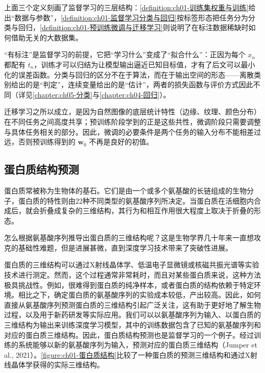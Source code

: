 \documentclass[../../main.tex]{subfiles}
\begin{document}
\begin{remark}
上面三个定义刻画了监督学习的三层结构：\cref{definition:ch01-训练集权重与训练}给出“数据与参数”，\cref{definition:ch01-监督学习分类与回归}按标签形态把任务分为分类与回归，\cref{definition:ch01-预训练微调与迁移学习}则说明了在标注数据稀缺时如何借助无关的大数据集。

“有标注”是监督学习的前提，它把“学习什么”变成了“拟合什么”：正因为每个 $x_n$ 都配有 $t_n$，训练才可以归结为让模型输出逼近已知目标值，才有了后文可以最小化的误差函数。分类与回归的区分不在于算法，而在于输出空间的形态——离散类别给出的是“判定”，连续变量给出的是“估计”，两者的损失函数与评价方式因此不同（详见\cref{chapter:ch05-分类}与\cref{chapter:ch04-回归}）。

迁移学习之所以成立，是因为自然图像的底层统计特性（边缘、纹理、颜色分布）在不同任务之间高度共享；预训练阶段学到的正是这些共性，微调阶段只需要调整与具体任务相关的部分。因此，微调的必要条件是两个任务的输入分布不能相差过远，否则预训练得到的 $\mathbf{w}_{0}$ 不再是良好的初值。
\end{remark}

\subsection{蛋白质结构预测}\label{subsection:ch01-蛋白质结构预测}

蛋白质常被称为生物体的基石。它们是由一个或多个氨基酸的长链组成的生物分子，蛋白质的特性则由22种不同类型的氨基酸序列所决定。当蛋白质在活细胞内合成后，就会折叠成复杂的三维结构，其行为和相互作用很大程度上取决于折叠的形态。

怎么根据氨基酸序列推导出蛋白质的三维结构呢？这是生物学界几十年来一直想攻克的基础性难题，但是进展甚微，直到深度学习技术带来了突破性进展。

蛋白质的三维结构可以通过X射线晶体学、低温电子显微镜或核磁共振光谱等实验技术进行测定。然而，这个过程通常非常耗时，而且对某些蛋白质来说，这种方法极具挑战性。例如，很难得到蛋白质的纯净样本，或者蛋白质的结构依赖于特定环境。相比之下，确定蛋白质的氨基酸序列的实验成本较低，产出较高。因此，如何直接从氨基酸序列预测蛋白质的三维结构引起广泛关注，这有助于更好地了解生物过程，以及用于新药研发等实际应用。我们可以以氨基酸序列为输入、以蛋白质的三维结构为输出来训练深度学习模型，其中的训练数据包含了已知的氨基酸序列和对应的蛋白质三维结构。因此，蛋白质结构预测也是监督学习的一个例子。经过训练的系统能够以新的氨基酸序列为输入，预测对应的蛋白质三维结构（Jumper et al., 2021）。\cref{figure:ch01-蛋白质结构}比较了一种蛋白质的预测三维结构和通过X射线晶体学获得的实际三维结构。
\end{document}
